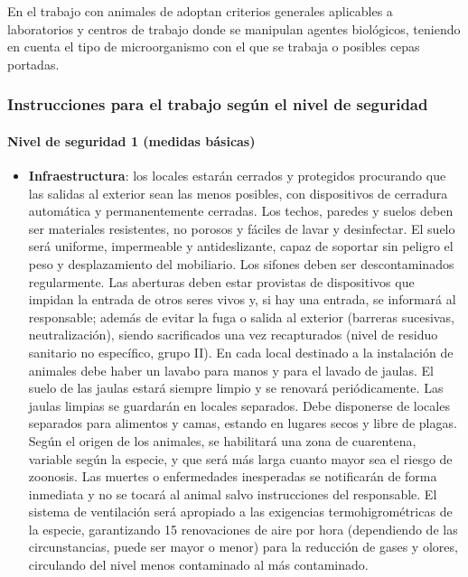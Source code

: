 En el trabajo con animales de adoptan criterios generales aplicables a laboratorios y centros de trabajo donde se manipulan agentes biológicos, teniendo en cuenta el tipo de microorganismo con el que se trabaja o posibles cepas portadas.
\subsubsection{Instrucciones para el trabajo según el nivel de seguridad}
\paragraph{Nivel de seguridad 1 (medidas básicas)}
\begin{itemize}[itemsep=0pt,parsep=0pt,topsep=0pt,partopsep=0pt]
    \item \textbf{Infraestructura}: los locales estarán cerrados y protegidos procurando que las salidas al exterior sean las menos posibles, con dispositivos de cerradura automática y permanentemente cerradas. Los techos, paredes y suelos deben ser materiales resistentes, no porosos y fáciles de lavar y desinfectar. El suelo será uniforme, impermeable y antideslizante, capaz de soportar sin peligro el peso y desplazamiento del mobiliario. Los sifones deben ser descontaminados regularmente. Las aberturas deben estar provistas de dispositivos que impidan la entrada de otros seres vivos y, si hay una entrada, se informará al responsable; además de evitar la fuga o salida al exterior (barreras sucesivas, neutralización), siendo sacrificados una vez recapturados (nivel de residuo sanitario no específico, grupo II). En cada local destinado a la instalación de animales debe haber un lavabo para manos y para el lavado de jaulas. El suelo de las jaulas estará siempre limpio y se renovará periódicamente. Las jaulas limpias se guardarán en locales separados. Debe disponerse de locales separados para alimentos y camas, estando en lugares secos y libre de plagas. Según el origen de los animales, se habilitará una zona de cuarentena, variable según la especie, y que será más larga cuanto mayor sea el riesgo de zoonosis. Las muertes o enfermedades inesperadas se notificarán de forma inmediata y no se tocará al animal salvo instrucciones del responsable. El sistema de ventilación será apropiado a las exigencias termohigrométricas de la especie, garantizando 15 renovaciones de aire por hora (dependiendo de las circunstancias, puede ser mayor o menor) para la reducción de gases y olores, circulando del nivel menos contaminado al más contaminado. 

\end{itemize}
